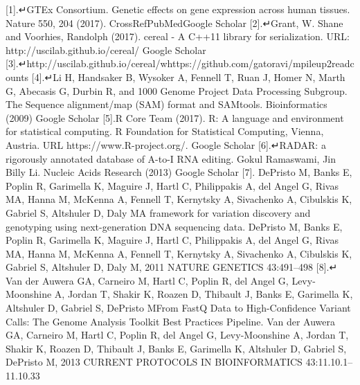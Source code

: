     [1].↵GTEx Consortium. Genetic effects on gene expression across human tissues. Nature 550, 204 (2017).
    CrossRefPubMedGoogle Scholar
    [2].↵Grant, W. Shane and Voorhies, Randolph (2017). cereal - A C++11 library for serialization. URL: http://uscilab.github.io/cereal/
    Google Scholar
    [3].↵http://uscilab.github.io/cereal/whttps://github.com/gatoravi/mpileup2readcounts
    [4].↵Li H, Handsaker B, Wysoker A, Fennell T, Ruan J, Homer N, Marth G, Abecasis G, Durbin R, and 1000 Genome Project Data Processing Subgroup. The Sequence alignment/map (SAM) format and SAMtools. Bioinformatics (2009)
    Google Scholar
    [5].R Core Team (2017). R: A language and environment for statistical computing. R Foundation for Statistical Computing, Vienna, Austria. URL https://www.R-project.org/.
    Google Scholar
    [6].↵RADAR: a rigorously annotated database of A-to-I RNA editing. Gokul Ramaswami, Jin Billy Li. Nucleic Acids Research (2013)
    Google Scholar
    [7].
        DePristo M, Banks E, Poplin R, Garimella K, Maguire J, Hartl C, Philippakis A, del Angel G, Rivas MA, Hanna M, McKenna A, Fennell T, Kernytsky A, Sivachenko A, Cibulskis K, Gabriel S, Altshuler D, Daly MA framework for variation discovery and genotyping using next-generation DNA sequencing data. DePristo M, Banks E, Poplin R, Garimella K, Maguire J, Hartl C, Philippakis A, del Angel G, Rivas MA, Hanna M, McKenna A, Fennell T, Kernytsky A, Sivachenko A, Cibulskis K, Gabriel S, Altshuler D, Daly M, 2011 NATURE GENETICS 43:491–498
    [8].↵
        Van der Auwera GA, Carneiro M, Hartl C, Poplin R, del Angel G, Levy-Moonshine A, Jordan T, Shakir K, Roazen D, Thibault J, Banks E, Garimella K, Altshuler D, Gabriel S, DePristo MFrom FastQ Data to High-Confidence Variant Calls: The Genome Analysis Toolkit Best Practices Pipeline. Van der Auwera GA, Carneiro M, Hartl C, Poplin R, del Angel G, Levy-Moonshine A, Jordan T, Shakir K, Roazen D, Thibault J, Banks E, Garimella K, Altshuler D, Gabriel S, DePristo M, 2013 CURRENT PROTOCOLS IN BIOINFORMATICS 43:11.10.1–11.10.33

